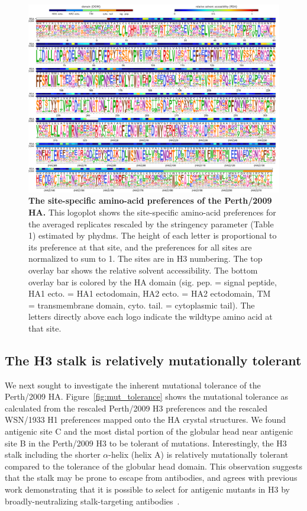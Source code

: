\documentclass[11pt]{article}
\begin{document}
\begin{figure}
\centerline{\includegraphics[width=\textwidth]{figs/prefslogoplot/rescaled-avgprefs_prefs.pdf}}
\caption{\label{fig:logoplot}
{\bf The site-specific amino-acid preferences of the Perth/2009 HA.}
This logoplot shows the site-specific amino-acid preferences for the averaged replicates rescaled by the stringency parameter (Table 1) estimated by phydms.
The height of each letter is proportional to its preference at that site, and the preferences for all sites are normalized to sum to 1.
The sites are in H3 numbering.
The top overlay bar shows the relative solvent accessibility.
The bottom overlay bar is colored by the HA domain (sig. pep. = signal peptide, HA1 ecto. = HA1 ectodomain, HA2 ecto. = HA2 ectodomain, TM = transmembrane domain, cyto. tail. = cytoplasmic tail).
The letters directly above each logo indicate the wildtype amino acid at that site.
}
\end{figure}

\subsection*{The H3 stalk is relatively mutationally tolerant}
We next sought to investigate the inherent mutational tolerance of the Perth/2009 HA. 
Figure~\ref{fig:mut_tolerance} shows the mutational tolerance as calculated from the rescaled Perth/2009 H3 preferences and the rescaled WSN/1933 H1 preferences mapped onto the HA crystal structures.
We found antigenic site C and the most distal portion of the globular head near antigenic site B in the Perth/2009 H3 to be tolerant of mutations.
Interestingly, the H3 stalk including the shorter $\alpha$-helix (helix A) is relatively mutationally tolerant compared to the tolerance of the globular head domain. 
This observation suggests that the stalk may be prone to escape from antibodies, and agrees with previous work demonstrating that it is possible to select for antigenic mutants in H3 by broadly-neutralizing stalk-targeting antibodies~\citep{ekiert2011highly, friesen2014common, chai2016two, yamayoshi2017human}.
\end{document}

